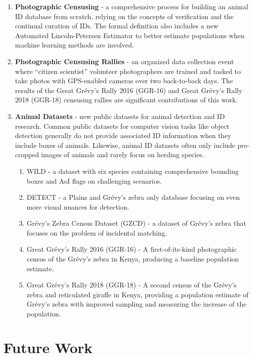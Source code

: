 \begin{enumerate}
\begin{enumerate}
          \end{enumerate}
    \item \textbf{Photographic Censusing} - a comprehensive process for building an animal ID database from scratch, relying on the concepts of verification and the continual curation of IDs.  The formal definition also includes a new Automated Lincoln-Petersen Estimator to better estimate populations when machine learning methods are involved.
    \item \textbf{Photographic Censusing Rallies} - an organized data collection event where ``citizen scientist'' volunteer photographers are trained and tasked to take photos with GPS-enabled cameras over two back-to-back days.  The results of the Great Gr\'evy's Rally 2016 (GGR-16) and Great Gr\'evy's Rally 2018 (GGR-18) censusing rallies are significant contributions of this work.
    \item \textbf{Animal Datasets} - new public datasets for animal detection and ID research.  Common public datasets for computer vision tasks like object detection generally do not provide associated ID information when they include boxes of animals.  Likewise, animal ID datasets often only include pre-cropped images of animals and rarely focus on herding species.
          \begin{enumerate}
              \item WILD - a dataset with six species containing comprehensive bounding boxes and AoI flags on challenging scenarios.
              \item DETECT - a Plains and Gr\'evy's zebra only database focusing on even more visual nuances for detection.
              \item Gr\'evy's Zebra Census Dataset (GZCD) - a dataset of Gr\'evy's zebra that focuses on the problem of incidental matching.
              \item Great Gr\'evy's Rally 2016 (GGR-16) - A first-of-its-kind photographic census of the Gr\'evy's zebra in Kenya, producing a baseline population estimate.
              \item Great Gr\'evy's Rally 2018 (GGR-18) - A second census of the Gr\'evy's zebra and reticulated giraffe in Kenya, providing a population estimate of Gr\'evy's zebra with improved sampling and measuring the increase of the population.
          \end{enumerate}
\end{enumerate}

\section{Future Work}


